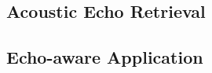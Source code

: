\documentclass[pdftex,dvipsnames]{dissertation}
\begin{document}
\begin{fullwidth}
\part{Acoustic Echo Retrieval}\label{pt:estimation}
\end{fullwidth}
\parttoc[n]
% 

% 
% 
% 

\begin{fullwidth}
\part{Echo-aware Application}\label{pt:application}
\end{fullwidth}
\parttoc[n]
% 
% 
% 
% 

% 


\backmatter{}

\clearpage
\addappheadtotoc
% 
\appendix
\appendix
% 
% 
% 
% 
% 
% 


% 
\end{document}
